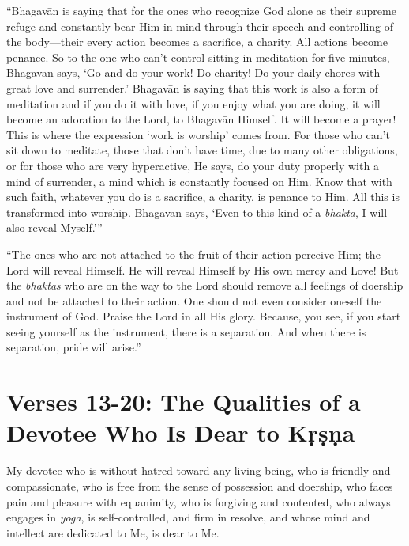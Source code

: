 \enquote{Bhagavān is saying that for the ones who recognize God alone as their supreme refuge and constantly bear Him in mind through their speech and controlling of the body---their every action becomes a sacrifice, a charity. All actions become penance. So to the one who can’t control sitting in meditation for five minutes, Bhagavān says, \enquote{Go and do your work! Do charity! Do your daily chores with great love and surrender.} Bhagavān is saying that this work is also a form of meditation and if you do it with love, if you enjoy what you are doing, it will become an adoration to the Lord, to Bhagavān Himself. It will become a prayer! This is where the expression \enquote{work is worship} comes from. For those who can’t sit down to meditate, those that don’t have time, due to many other obligations, or for those who are very hyperactive, He says, do your duty properly with a mind of surrender, a mind which is constantly focused on Him. Know that with such faith, whatever you do is a sacrifice, a charity, is penance to Him. All this is transformed into worship. Bhagavān says, \enquote{Even to this kind of a \textit{bhakta}, I will also reveal Myself.}}

\enquote{The ones who are not attached to the fruit of their action perceive Him; the Lord will reveal Himself. He will reveal Himself by His own mercy and Love! But the \textit{bhaktas} who are on the way to the Lord should remove all feelings of doership and not be attached to their action. One should not even consider oneself the instrument of God. Praise the Lord in all His glory. Because, you see, if you start seeing yourself as the instrument, there is a separation. And when there is separation, pride will arise.}


\section{Verses 13-20: The Qualities of a Devotee Who Is Dear to Kṛṣṇa}\label{sec-verses-13-20-the-qualities-of-a-devotee-who-is-dear-to-krsna}

{My devotee who is without hatred toward any living being, who is friendly and compassionate, who is free from the sense of possession and doership, who faces pain and pleasure with equanimity, who is forgiving and contented, who always engages in \textit{yoga}, is self-controlled, and firm in resolve, and whose mind and intellect are dedicated to Me, is dear to Me.}

